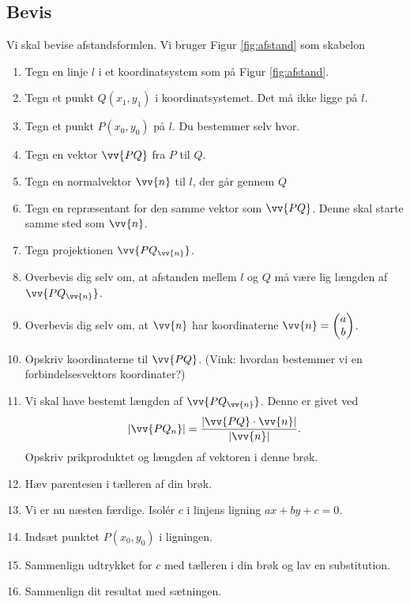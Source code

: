 \subsection*{Bevis}
Vi skal bevise afstandsformlen. Vi bruger Figur \ref{fig:afstand} som skabelon
\begin{enumerate}[label=\roman*)]
	\item Tegn en linje $l$ i et koordinatsystem som på Figur \ref{fig:afstand}.
	\item Tegn et punkt $Q(x_1,y_1)$ i koordinatsystemet. Det må ikke ligge på $l$.
	\item Tegn et punkt $P(x_0,y_0)$ på $l$. Du bestemmer selv hvor. 
	\item Tegn en vektor $\vv{PQ}$ fra $P$ til $Q$. 
	\item Tegn en normalvektor $\vv{n}$ til $l$, der går gennem $Q$
	\item Tegn en repræsentant for den samme vektor som $\vv{PQ}$. Denne skal starte samme sted som $\vv{n}$. 
	\item Tegn projektionen $\vv{PQ_{\vv{n}}}$.
	\item Overbevis dig selv om, at afstanden mellem $l$ og $Q$ må være lig længden af $\vv{PQ_{\vv{n}}}$.
	\item Overbevis dig selv om, at $\vv{n}$ har koordinaterne $\vv{n}=\begin{pmatrix}
	a \\ b
	\end{pmatrix}$.
	\item Opskriv koordinaterne til $\vv{PQ}$. (Vink: hvordan bestemmer vi en forbindelsesvektors koordinater?)
	\item Vi skal have bestemt længden af $\vv{PQ_{\vv{n}}}$. Denne er givet ved
	\begin{align*}
		|\vv{PQ_{n}}| = \frac{|\vv{PQ}\cdot \vv{n}|}{|\vv{n}|}.
	\end{align*}
	Opskriv prikproduktet og længden af vektoren i denne brøk.
	\item Hæv parentesen i tælleren af din brøk.
	\item Vi er nu næsten færdige. Isolér $c$ i linjens ligning $ax+by+c=0$. 
	\item Indsæt punktet $P(x_0,y_0)$ i ligningen. 
	\item Sammenlign udtrykket for $c$ med tælleren i din brøk og lav en substitution. 
	\item Sammenlign dit resultat med sætningen. 
\end{enumerate}